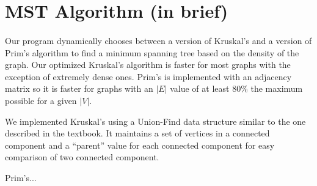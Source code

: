 \section{MST Algorithm (in brief)}
\label{sec:algbrief}

\paragraph{}
Our program dynamically chooses between a version of Kruskal's and a
version of Prim's
algorithm to find a minimum spanning tree based on the density of the
graph. Our optimized Kruskal's
algorithm is faster for most graphs with the exception of extremely dense
ones. Prim's is implemented with an adjacency matrix so it is faster for
graphs with an $|E|$ value of at least 80\% the maximum possible for a
given $|V|$.

We implemented Kruskal's using a Union-Find data structure similar to the
one described in the textbook. It maintains a set of vertices in a
connected component and a ``parent'' value for each connected component
for easy comparison of two connected component.

Prim's...
